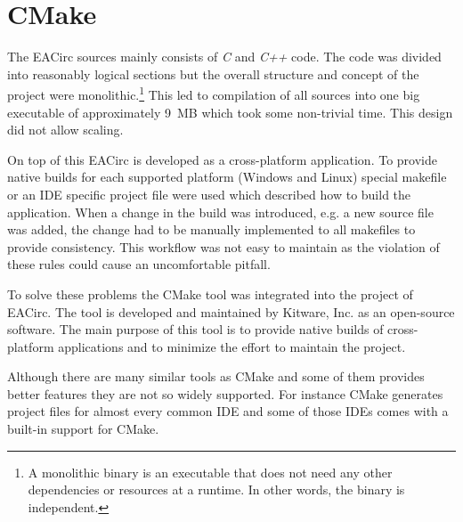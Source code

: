 \documentclass[12pt,oneside]{fithesis2}
\begin{document}
\FrontMatter
	\ThesisTitlePage
	\tableofcontents

\MainMatter
\chapter{CMake}
The EACirc sources mainly consists of \emph{C} and \emph{C++} code. The code was divided into reasonably logical sections but the overall structure and concept of the project were monolithic.\footnote{A monolithic binary is an executable that does not need any other dependencies or resources at a runtime. In other words, the binary is independent.} This led to compilation of all sources into one big executable of approximately 9~MB which took some non-trivial time. This design did not allow scaling.

On top of this EACirc is developed as a cross-platform application. To provide native builds for each supported platform (Windows \cite{win} and Linux) special makefile or an IDE specific project file were used which described how to build the application. When a change in the build was introduced, e.g. a new source file was added, the change had to be manually implemented to all makefiles to provide consistency. This workflow was not easy to maintain as the violation of these rules could cause an uncomfortable pitfall.

To solve these problems the CMake \cite{cmake} tool was integrated into the project of EACirc. The tool is developed and maintained by Kitware, Inc. \cite{kitware} as an open-source software. The main purpose of this tool is to provide native builds of cross-platform applications and to minimize the effort to maintain the project.

Although there are many similar tools as CMake and some of them provides better features they are not so widely supported. For instance CMake generates project files for almost every common IDE and some of those IDEs comes with a built-in support for CMake.
\end{document}
